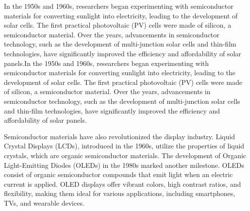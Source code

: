 
In the 1950s and 1960s, researchers began experimenting with semiconductor materials for converting sunlight into electricity, leading to the development of solar cells. The first practical photovoltaic (PV) cells were made of silicon, a semiconductor material. Over the years, advancements in semiconductor technology, such as the development of multi-junction solar cells and thin-film technologies, have significantly improved the efficiency and affordability of solar panels.In the 1950s and 1960s, researchers began experimenting with semiconductor materials for converting sunlight into electricity, leading to the development of solar cells. The first practical photovoltaic (PV) cells were made of silicon, a semiconductor material. Over the years, advancements in semiconductor technology, such as the development of multi-junction solar cells and thin-film technologies, have significantly improved the efficiency and affordability of solar panels.





Semiconductor materials have also revolutionized the display industry. Liquid Crystal Displays (LCDs), introduced in the 1960s, utilize the properties of liquid crystals, which are organic semiconductor materials. The development of Organic Light-Emitting Diodes (OLEDs) in the 1980s marked another milestone. OLEDs consist of organic semiconductor compounds that emit light when an electric current is applied. OLED displays offer vibrant colors, high contrast ratios, and flexibility, making them ideal for various applications, including smartphones, TVs, and wearable devices.








